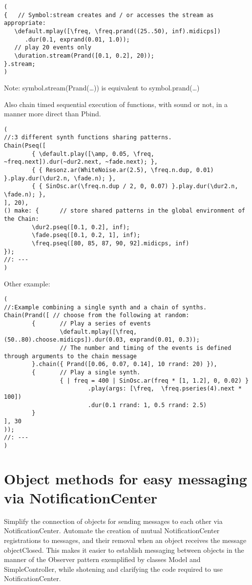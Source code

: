 \documentclass[11pt]{article}
\begin{document}
\begin{verbatim}
(
{   // Symbol:stream creates and / or accesses the stream as appropriate: 
   \default.mplay([\freq, \freq.prand((25..50), inf).midicps])
      .dur(0.1, exprand(0.01, 1.0));
   // play 20 events only
   \duration.stream(Prand([0.1, 0.2], 20)); 
}.stream;    
)
\end{verbatim}

Note: symbol.stream(Prand(\ldots{})) is equivalent to symbol.prand(\ldots{})

Also chain timed sequential execution of functions, with sound or not, in a manner more direct than Pbind.

\begin{verbatim}
(
//:3 different synth functions sharing patterns. 
Chain(Pseq([
        { \default.play([\amp, 0.05, \freq, ~freq.next]).dur(~dur2.next, ~fade.next); },
        { { Resonz.ar(WhiteNoise.ar(2.5), \freq.n.dup, 0.01) }.play.dur(\dur2.n, \fade.n); },
        { { SinOsc.ar(\freq.n.dup / 2, 0, 0.07) }.play.dur(\dur2.n, \fade.n); },
], 20), 
() make: {      // store shared patterns in the global environment of the Chain:
        \dur2.pseq([0.1, 0.2], inf);
        \fade.pseq([0.1, 0.2, 1], inf); 
        \freq.pseq([80, 85, 87, 90, 92].midicps, inf) 
});
//: ---
)
\end{verbatim}

Other example: 

\begin{verbatim}
(
//:Example combining a single synth and a chain of synths.
Chain(Prand([ // choose from the following at random:
        {       // Play a series of events
                \default.mplay([\freq, (50..80).choose.midicps]).dur(0.03, exprand(0.01, 0.3));
                // The number and timing of the events is defined through arguments to the chain message
        }.chain({ Prand([0.06, 0.07, 0.14], 10 rrand: 20) }),
        {       // Play a single synth.
                { | freq = 400 | SinOsc.ar(freq * [1, 1.2], 0, 0.02) }
                        .play(args: [\freq,  \freq.pseries(4).next * 100])
                        .dur(0.1 rrand: 1, 0.5 rrand: 2.5) 
        }
], 30
));
//: ---
)
\end{verbatim}
\section{Object methods for easy messaging via NotificationCenter}
\label{sec-5}


Simplify the connection of objects for sending messages to each other via NotificationCenter. Automate the creation of mutual NotificationCenter registrations to messages, and their removal when an object receives the message objectClosed. This makes it easier to establish messaging between objects in the manner of the Observer pattern exemplified by classes Model and SimpleController, while shotening and clarifying the code required to use NotificationCenter.
\end{document}
